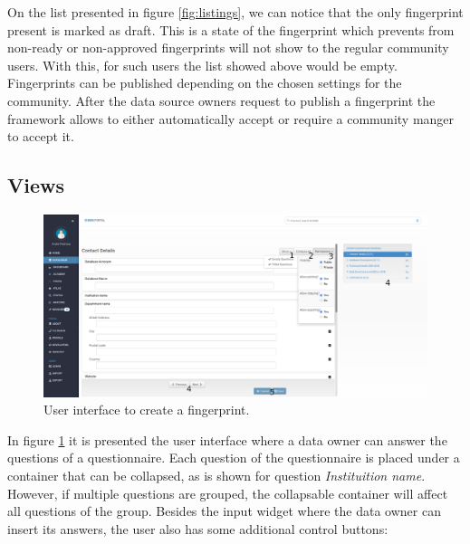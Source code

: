 On the list presented in figure \ref{fig:listings}, we can notice that the only fingerprint present is marked as draft.
This is a state of the fingerprint which prevents from non-ready or non-approved fingerprints will not show to the regular community users.
With this, for such users the list showed above would be empty.
Fingerprints can be published depending on the chosen settings for the community.
After the data source owners request to publish a fingerprint the framework allows to either automatically accept or require a community manger to accept it.

\subsection*{Views}

\begin{figure}[H]
    \center
    \includegraphics[width=\textwidth]{fingerprint-new}
    \caption{User interface to create a fingerprint.}
    \label{fig:fingerprint-new}
\end{figure}

In figure \ref{fig:fingerprint-new} it is presented the user interface where a data owner can answer the questions of a questionnaire.
Each question of the questionnaire is placed under a container that can be collapsed, as is shown for question \textit{Instituition name}.
However, if multiple questions are grouped, the collapsable container will affect all questions of the group.
Besides the input widget where the data owner can insert its answers, the user also has some additional control buttons:

